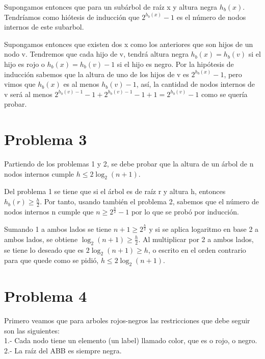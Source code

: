 \documentclass[12pt,letterpaper]{article}
\begin{document}
Supongamos entonces que para un subárbol de raíz x y altura negra $h_{b}(x)$. Tendríamos como hiótesis de inducción que  $2^{h_{b}(x)}-1$ es el número de nodos internos de este subarbol.

Supongamos entonces que existen dos x como los anteriores que son hijos de un nodo v. Tendremos que cada hijo de v, tendrá altura negra $h_{b}(x)=h_{b}(v)$ si el hijo es rojo o $h_{b}(x)=h_{b}(v)-1$ si el hijo es negro. Por la hipótesis de inducción sabemos que la altura de uno de los hijos de v es $2^{h_{b}(x)}-1$, pero vimos  que $h_{b}(x)$ es al menos $h_{b}(v)-1$, así, la cantidad de nodos internos de v será al menos $2^{h_{b}(v)-1}-1+2^{h_{b}(v)-1}-1+1=2^{h_{b}(v)}-1$ como se quería probar.

\section{Problema 3}

Partiendo de los problemas 1 y 2, se debe probar que la altura de un árbol de n nodos internos cumple $h \leq 2 \log_{2}(n+1)$.\newline

Del problema 1 se tiene que si el árbol es de raíz r y  altura h, entonces $h_b(r)\geq \frac{h}{2}$. Por tanto, usando también el problema 2, sabemos que el número de nodos internos n cumple que $n \geq 2^{\frac{h}{2}}-1 $ por lo que se probó por inducción. \newline

Sumando 1 a ambos lados se tiene $n+1 \geq 2^{\frac{h}{2}} $ y si se aplica logaritmo en base 2 a ambos lados, se obtiene  $  \log_{2}(n+1) \geq \frac{h}{2}$. Al multiplicar por 2 a ambos lados, se tiene lo deseado que es $  2\log_{2}(n+1) \geq h$, o escrito en el orden contrario para que quede como se pidió, $h \leq 2 \log_{2}(n+1)$.

\section{Problema 4}
    Primero veamos que para arboles rojos-negros las restricciones que debe seguir son las siguientes:\\
    
    1.- Cada nodo tiene un elemento (un label) llamado color, que es o rojo, o negro.\\
    
    2.- La raíz del ABB es siempre negra.\\
    
\end{document}
